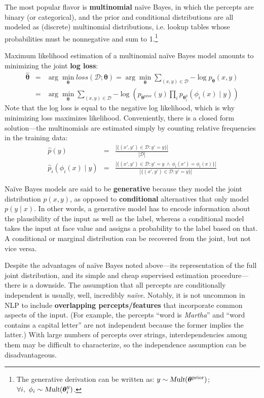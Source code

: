 \documentclass[11pt,letterpaper]{article}
\begin{document}
The most popular flavor is \textbf{multinomial} na\"{i}ve Bayes, in which the 
percepts are binary (or categorical), and 
the prior and conditional distributions are all modeled as (discrete) multinomial distributions, i.e. lookup tables 
whose probabilities must be nonnegative and sum to 1.\footnote{The generative derivation can be written as: 
$y \sim \textsl{Mult}(\boldsymbol{\theta}^{\text{prior}})$; $\forall i,~\phi_i \sim \textsl{Mult}(\boldsymbol{\theta}^y_i)$.}

Maximum likelihood estimation of a multinomial na\"{i}ve Bayes model amounts to minimizing the joint \textbf{log loss}:
\begin{eqnarray}
\hat{\boldsymbol{\theta}} &=& \arg\min_{\boldsymbol{\theta}} \textit{loss}(\mathcal{D}; \boldsymbol{\theta})
=   \arg\min_{\boldsymbol{\theta}}{\sum_{(x,y) \in \mathcal{D}}{-\log{p_{\boldsymbol{\theta}}(x,y)}}} \\
&=& \arg\min_{\boldsymbol{\theta}}{\sum_{(x,y) \in \mathcal{D}}{-\log{\left(p_{\boldsymbol{\theta}^{\text{prior}}}(y)\prod_i{p_{\boldsymbol{\theta}^y_i}(\phi_i(x) \mid y)}\right)}}}
\end{eqnarray}
Note that the log loss is equal to the negative log likelihood, which is why minimizing loss maximizes likelihood.
Conveniently, there is a closed form solution---the multinomials are estimated simply by 
counting relative frequencies in the training data:
\begin{eqnarray}
\hat{p}(y) &=& \frac{|\{(x',y')\in\mathcal{D}: y'=y\}|}{|\mathcal{D}|} \\
\hat{p}_i(\phi_i(x) \mid y) &=& \frac{|\{(x',y')\in\mathcal{D}: y'=y~\wedge~\phi_i(x')=\phi_i(x)\}|}{|\{(x',y')\in\mathcal{D}: y'=y\}|}
\end{eqnarray}

Na\"{i}ve Bayes models are said to be \textbf{generative} because they model 
the joint distribution $p(x,y)$, as opposed to \textbf{conditional} alternatives that only model $p(y \mid x)$.
In other words, a generative model has to encode information about the plausibility of the input as well as the label, 
whereas a conditional model takes the input at face value and assigns a probability to the label based on that.
A conditional or marginal distribution can be recovered from the joint, but not vice versa.

Despite the advantages of na\"{i}ve Bayes noted above---its representation of the full joint distribution, 
and its simple and cheap supervised estimation procedure---there is a downside. 
The assumption that all percepts are conditionally independent is usually, well, incredibly {\em na\"{i}ve}. 
Notably, it is not uncommon in NLP to include \textbf{overlapping percepts\slash features} 
that incorporate common aspects of the input. (For example, the percepts ``word is \textit{Martha}'' 
and ``word contains a capital letter'' are not independent because the former implies the latter.)
With large numbers of percepts over strings, interdependencies among them may be difficult to 
characterize, so the independence assumption can be disadvantageous. 
\end{document}
